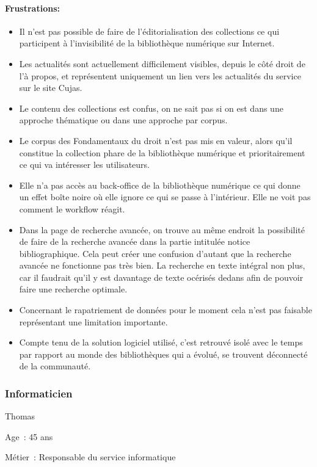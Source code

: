 \paragraph*{Frustrations:}
\begin{itemize}
	\item Il n’est pas possible de faire de l’éditorialisation des collections ce qui participent à l’invisibilité de la bibliothèque numérique sur Internet. 
\item Les actualités sont actuellement difficilement visibles, depuis le côté droit de l’à propos, et représentent uniquement un lien vers les actualités du service sur le site Cujas. 
\item Le contenu des collections est confus, on ne sait pas si on est dans une approche thématique ou dans une approche par corpus. 
\item Le corpus des Fondamentaux du droit n’est pas mis en valeur, alors qu’il constitue la collection phare de la bibliothèque numérique et prioritairement ce qui va intéresser les utilisateurs. 
\item Elle n’a pas accès au back-office de la bibliothèque numérique ce qui donne un effet boîte noire où elle ignore ce qui se passe à l’intérieur. Elle ne voit pas comment le workflow réagit.
\item Dans la page de recherche avancée, on trouve au même endroit la possibilité de faire de la recherche avancée dans la partie intitulée notice bibliographique. Cela peut créer une confusion d’autant que la recherche avancée ne fonctionne pas très bien. La recherche en texte intégral non plus, car il faudrait qu’il y est davantage de texte océrisés dedans afin de pouvoir faire une recherche optimale.
\item Concernant le rapatriement de données pour le moment cela n’est pas faisable représentant une limitation importante. 
\item Compte tenu de la solution logiciel utilisé, c’est retrouvé isolé avec le temps par rapport au monde des bibliothèques qui a évolué, se trouvent déconnecté de la communauté.
\end{itemize}

\subsubsection*{Informaticien}
Thomas

Age : 45 ans

Métier : Responsable du service informatique

